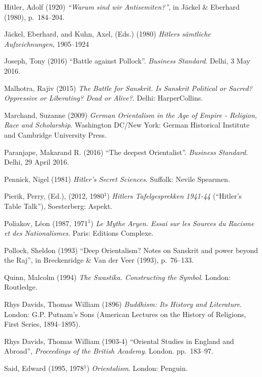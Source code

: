 \begin{thebibliography}{99}
Hitler, Adolf (1920) {\sl “Warum sind wir Antisemiten?”}, in Jäckel \& Eberhard (1980), p.~184--204.

Jäckel, Eberhard, and Kuhn, Axel, (Eds.) (1980) {\sl Hitlers sämtliche Aufzeichnungen}, 1905--1924

Joseph, Tony (2016) “Battle against Pollock”. {\sl Business Standard}. Delhi, 3 May 2016.

Malhotra, Rajiv (2015) {\sl The Battle for Sanskrit. Is Sanskrit Political or Sacred? Oppressive or Liberating? Dead or Alive?}. Delhi: HarperCollins.

Marchand, Suzanne (2009) {\sl German Orientalism in the Age of Empire - Religion, Race and Scholarship}. Washington DC/New York: German Historical Institute and Cambridge University Press. 

Paranjape, Makarand R. (2016) “The deepest Orientalist”. {\sl Business Standard}. Delhi, 29 April 2016.

Pennick, Nigel (1981) {\sl Hitler’s Secret Sciences}. Suffolk: Nevile Spearmen.

Pierik, Perry, (Ed.), (2012, 1980$^1$) {\sl Hitlers Tafelgesprekken 1941-44} (“Hitler’s Table Talk”), Soesterberg: Aspekt.

Poliakov, Léon (1987, 1971$^1$) {\sl Le Mythe Aryen. Essai sur les Sources du Racisme et des Nationalismes}. Paris: Editions Complexe.

Pollock, Sheldon (1993) “Deep Orientalism? Notes on Sanskrit and power beyond the Raj”, in Breckenridge \& Van der Veer (1993), p.~76--133.

Quinn, Malcolm (1994) {\sl The Swastika. Constructing the Symbol}. London: Routledge.

Rhys Davids, Thomas William (1896) {\sl Buddhism: Its History and Literature}. London: G.P. Putnam’s Sons (American Lectures on the History of Religions, First Series, 1894--1895).

Rhys Davids, Thomas William (1903-4) “Oriental Studies in England and Abroad”, {\sl Proceedings of the British Academy}. London. pp.~183--97.

Said, Edward (1995, 1978$^1$) {\sl Orientalism}. London: Penguin.


\end{thebibliography}
